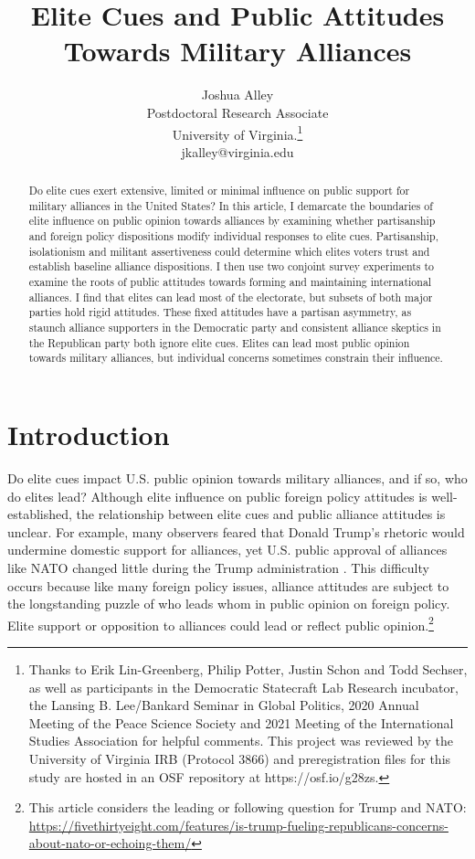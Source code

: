 \documentclass[12pt]{article}
\title{\textbf{Elite Cues and Public Attitudes Towards Military Alliances}}
\author{Joshua Alley \\
Postdoctoral Research Associate \\
University of Virginia.\thanks{Thanks to Erik Lin-Greenberg, Philip Potter, Justin Schon and Todd Sechser, as well as participants in the Democratic Statecraft Lab Research incubator, the Lansing B. Lee/Bankard Seminar in Global Politics, 2020 Annual Meeting of the Peace Science Society and 2021 Meeting of the International Studies Association for helpful comments. This project was reviewed by the University of Virginia IRB (Protocol 3866) and preregistration files for this study are hosted in an OSF repository at https://osf.io/g28zs.} \\
jkalley@virginia.edu
}
\date{}
\begin{document}
\maketitle 

\doublespace 

\begin{abstract}
Do elite cues exert extensive, limited or minimal influence on public support for military alliances in the United States? 
In this article, I demarcate the boundaries of elite influence on public opinion towards alliances by examining whether partisanship and foreign policy dispositions modify individual responses to elite cues.
Partisanship, isolationism and militant assertiveness could determine which elites voters trust and establish baseline alliance dispositions. 
I then use two conjoint survey experiments to examine the roots of public attitudes towards forming and maintaining international alliances.  
I find that elites can lead most of the electorate, but subsets of both major parties hold rigid attitudes. 
These fixed attitudes have a partisan asymmetry, as staunch alliance supporters in the Democratic party and consistent alliance skeptics in the Republican party both ignore elite cues.  
Elites can lead most public opinion towards military alliances, but individual concerns sometimes constrain their influence.  
\end{abstract}


\newpage 


\section{Introduction}


Do elite cues impact U.S. public opinion towards military alliances, and if so, who do elites lead?
Although elite influence on public foreign policy attitudes is well-established, the relationship between elite cues and public alliance attitudes is unclear.
For example, many observers feared that Donald Trump's rhetoric would undermine domestic support for alliances, yet U.S. public approval of alliances like NATO changed little during the Trump administration \citep{PewNATO2020}. 
This difficulty occurs because like many foreign policy issues, alliance attitudes are subject to the longstanding puzzle of who leads whom in public opinion on foreign policy.
Elite support or opposition to alliances could lead or reflect public opinion.\footnote{This article considers the leading or following question for Trump and NATO: \url{https://fivethirtyeight.com/features/is-trump-fueling-republicans-concerns-about-nato-or-echoing-them/}}
\end{document}
